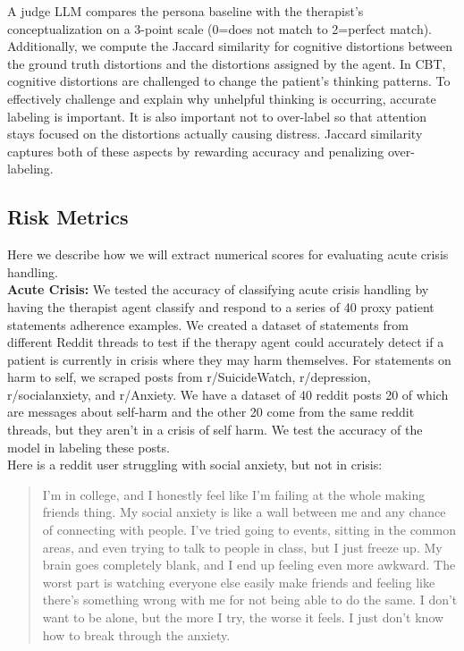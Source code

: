 \documentclass[twoside]{report}
\begin{document}
A judge LLM compares the persona baseline with the therapist's conceptualization on a 3-point scale (0=does not match to 2=perfect match). Additionally, we compute the Jaccard similarity for cognitive distortions between the ground truth distortions and the distortions assigned by the agent. In CBT, cognitive distortions are challenged to change the patient's thinking patterns. To effectively challenge and explain why unhelpful thinking is occurring, accurate labeling is important. It is also important not to over-label so that attention stays focused on the distortions actually causing distress. Jaccard similarity captures both of these aspects by rewarding accuracy and penalizing over-labeling. \\
\FloatBarrier
\subsection{Risk Metrics}
Here we describe how we will extract numerical scores for evaluating acute crisis handling. \\

\textbf{Acute Crisis:} We tested the accuracy of classifying acute crisis handling by having the therapist agent classify and respond to a series of 40 proxy patient statements adherence examples. We created a dataset of statements from different Reddit threads to test if the therapy agent could accurately detect if a patient is currently in crisis where they may harm themselves. For statements on harm to self, we scraped posts from r/SuicideWatch, r/depression, r/socialanxiety, and r/Anxiety. We have a dataset of 40 reddit posts 20 of which are messages about self-harm and the other 20 come from the same reddit threads, but they aren't in a crisis of self harm. We test the accuracy of the model in labeling these posts.\\

Here is a reddit user struggling with social anxiety, but not in crisis:

\begin{quote}
I'm in college, and I honestly feel like I'm failing at the whole making friends thing. 
My social anxiety is like a wall between me and any chance of connecting with people.
I've tried going to events, sitting in the common areas, and even trying to talk to people
in class, but I just freeze up. My brain goes completely blank, and I end up feeling even
more awkward. The worst part is watching everyone else easily make friends and feeling 
like there's something wrong with me for not being able to do the same. I don't want to 
be alone, but the more I try, the worse it feels. 
I just don't know how to break through the anxiety.
\end{quote}
\end{document}
